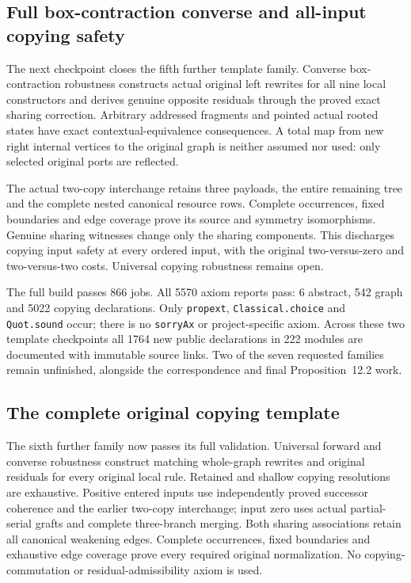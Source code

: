 \subsection{Full box-contraction converse and all-input copying safety}
The next checkpoint closes the fifth further template family. Converse
box-contraction robustness constructs actual original left rewrites for
all nine local constructors and derives genuine opposite residuals through
the proved exact sharing correction. Arbitrary addressed fragments and
pointed actual rooted states have exact contextual-equivalence consequences.
A total map from new right internal vertices to the original graph is neither
assumed nor used: only selected original ports are reflected.

The actual two-copy interchange retains three payloads, the entire remaining
tree and the complete nested canonical resource rows. Complete occurrences,
fixed boundaries and edge coverage prove its source and symmetry isomorphisms.
Genuine sharing witnesses change only the sharing components. This discharges
copying input safety at every ordered input, with the original two-versus-zero
and two-versus-two costs. Universal copying robustness remains open.

The full build passes 866 jobs. All 5570 axiom reports pass: 6 abstract,
542 graph and 5022 copying declarations. Only \texttt{propext},
\texttt{Classical.choice} and \texttt{Quot.sound} occur; there is no
\texttt{sorryAx} or project-specific axiom. Across these two template
checkpoints all 1764 new public declarations in 222 modules are documented
with immutable source links. Two of the seven requested families remain
unfinished, alongside the correspondence and final Proposition~12.2 work.


\subsection{The complete original copying template}
The sixth further family now passes its full validation. Universal forward
and converse robustness construct matching whole-graph rewrites and original
residuals for every original local rule. Retained and shallow copying
resolutions are exhaustive. Positive entered inputs use independently proved
successor coherence and the earlier two-copy interchange; input zero uses
actual partial-serial grafts and complete three-branch merging. Both sharing
associations retain all canonical weakening edges. Complete occurrences,
fixed boundaries and exhaustive edge coverage prove every required original
normalization. No copying-commutation or residual-admissibility axiom is used.

